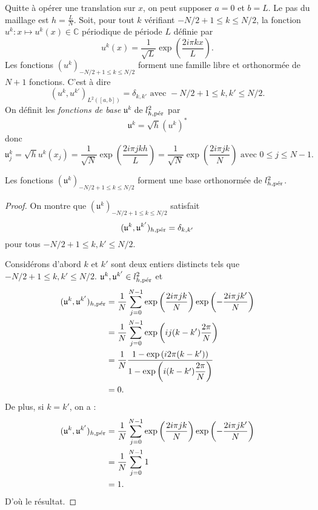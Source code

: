 Quitte à opérer une translation sur $x$, on peut supposer $a=0$ et $b=L$. Le pas du maillage est $h = \frac{L}{N}$.
Soit, pour tout $k$ vérifiant $-N/2+1 \leq k \leq N/2$, la fonction $u^k : x \mapsto u^k(x) \in \mathbb{C}$ périodique de période $L$ définie par 
\begin{equation}
u^k(x) = \dfrac{1}{\sqrt{L}} \exp \left( \dfrac{2 i \pi k x}{L} \right).
\end{equation}
Les fonctions $(u^k)_{-N/2 +1 \leq k \leq N/2}$ forment une famille libre et orthonormée de $N+1$ fonctions. C'est à dire
\begin{equation}
(u^k, u^{k'})_{L^2([a,b])} = \delta_{k,k'} \text{ avec } -N/2+1 \leq k, k' \leq N/2.
\end{equation}
On définit les \textit{fonctions de base} $\mathfrak{u}^k$ de $l^2_{h,\per}$ par
\begin{equation}
\mathfrak{u}^k = \sqrt{h} (u^k)^*
\end{equation}
donc 
\begin{equation}
\mathfrak{u}^k_j = \sqrt{h}  u^k(x_j) = \dfrac{1}{\sqrt{N}} \exp \left( \dfrac{2 i \pi j k h}{L} \right) = \dfrac{1}{\sqrt{N}} \exp \left( \dfrac{2 i \pi j k}{N} \right) \text{ avec } 0 \leq j \leq N-1.
\label{eq:base_fourier_disc}
\end{equation}


\begin{proposition}
Les fonctions $(\mathfrak{u}^k)_{-N/2+1 \leq k \leq N/2}$ forment une base orthonormée de $l^2_{h,\per}$.
\end{proposition}

\begin{proof}
On montre que $(\mathfrak{u}^k)_{-N/2+1 \leq k \leq N/2}$ satisfait
\begin{equation}
(\mathfrak{u}^k, \mathfrak{u}^{k'})_{h,\per} = \delta_{k,k'}
\end{equation}
pour tous $-N/2+1 \leq k, k' \leq N/2$.

Considérons d'abord $k$ et $k'$ sont deux entiers distincts tels que $-N/2+1 \leq k, k' \leq N/2$. $\mathfrak{u}^k, \mathfrak{u}^{k'} \in l^2_{h,\per}$ et
\begin{align*}
(\mathfrak{u}^k, \mathfrak{u}^{k'})_{h,\per} & = \dfrac{1}{N} \gsum_{j=0}^{N-1} \exp \left( \dfrac{2 i \pi j k}{N} \right) \exp \left( -\dfrac{2 i \pi j k'}{N} \right) \\
		& = \dfrac{1}{N} \gsum_{j=0}^{N-1} \exp \left( i j (k-k') \dfrac{2 \pi}{N} \right)\\
		& = \dfrac{1}{N} \dfrac{1 - \exp \left( i 2 \pi (k-k') \right)}{1 - \exp \left( i (k-k') \dfrac{2 \pi}{N}  \right)} \\
		& = 0.
\end{align*}
De plus, si $k=k'$, on a :
\begin{align*}
(\mathfrak{u}^k, \mathfrak{u}^{k'})_{h,\per} & = \dfrac{1}{N} \gsum_{j=0}^{N-1} \exp \left( \dfrac{2 i \pi j k}{N} \right) \exp \left( -\dfrac{2 i \pi j k'}{N} \right) \\
		& = \dfrac{1}{N} \gsum_{j=0}^{N-1} 1 \\
		& = 1.
\end{align*}
D'où le résultat.
\end{proof}

